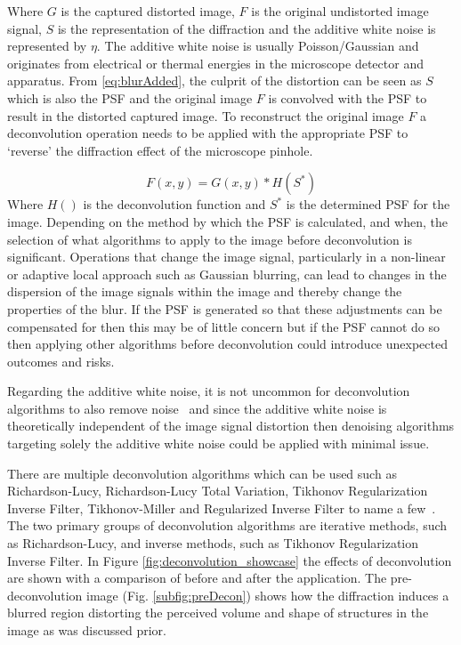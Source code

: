 Where $G$ is the captured distorted image, $F$ is the original undistorted image signal, $S$ is the representation of the diffraction and the additive white noise is represented by $\eta$. The additive white noise is usually Poisson/Gaussian and originates from electrical or thermal energies in the microscope detector and apparatus. From \ref{eq:blurAdded}, the culprit of the distortion can be seen as $S$ which is also the PSF and the original image $F$ is convolved with the PSF to result in the distorted captured image. To reconstruct the original image $F$ a deconvolution operation needs to be applied with the appropriate PSF to `reverse' the diffraction effect of the microscope pinhole.\par
\begin{equation}\label{eq:psf_added}
    F(x,y) = G(x,y)*H(S^\ast)
\end{equation}
Where $H()$ is the deconvolution function and $S^\ast$ is the determined PSF for the image. Depending on the method by which the PSF is calculated, and when, the selection of what algorithms to apply to the image before deconvolution is significant. Operations that change the image signal, particularly in a non-linear or adaptive local approach such as Gaussian blurring, can lead to changes in the dispersion of the image signals within the image and thereby change the properties of the blur. If the PSF is generated so that these adjustments can be compensated for then this may be of little concern but if the PSF cannot do so then applying other algorithms before deconvolution could introduce unexpected outcomes and risks.\par Regarding the additive white noise, it is not uncommon for deconvolution algorithms to also remove noise~\cite{PipelineDecon-Chaudhry} and since the additive white noise is theoretically independent of the image signal distortion then denoising algorithms targeting solely the additive white noise could be applied with minimal issue.\par There are multiple deconvolution algorithms which can be used such as Richardson-Lucy, Richardson-Lucy Total Variation, Tikhonov Regularization Inverse Filter, Tikhonov-Miller and Regularized Inverse Filter to name a few~\cite{DeconLab2}. The two primary groups of deconvolution algorithms are iterative methods, such as Richardson-Lucy, and inverse methods, such as Tikhonov Regularization Inverse Filter. In Figure \ref{fig:deconvolution_showcase} the effects of deconvolution are shown with a comparison of before and after the application. The pre-deconvolution image (Fig. \ref{subfig:preDecon}) shows how the diffraction induces a blurred region distorting the perceived volume and shape of structures in the image as was discussed prior.

